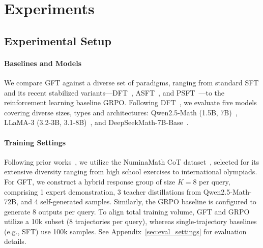 

\section{Experiments}
\subsection{Experimental Setup}
\label{sec:experimental_setup}

\paragraph{Baselines and Models}
We compare GFT against a diverse set of paradigms, ranging from standard SFT and its recent stabilized variants—DFT~\citep{wu2025generalization}, ASFT~\citep{zhu2025anchored}, and PSFT~\citep{zhu2025proximal}—to the reinforcement learning baseline GRPO. Following DFT~\citep{wu2025generalization}, we evaluate five models covering diverse sizes, types and architectures: Qwen2.5-Math (1.5B, 7B)~\citep{yang2024qwen2}, LLaMA-3 (3.2-3B, 3.1-8B)~\citep{dubey2024llama}, and DeepSeekMath-7B-Base~\citep{shao2024deepseekmath}.

\paragraph{Training Settings}
Following prior works~\citep{wu2025generalization,zhu2025anchored,ming2025one,zhou2025variational}, we utilize the NuminaMath CoT dataset~\citep{numina_math_datasets}, selected for its extensive diversity ranging from high school exercises to international olympiads. For GFT, we construct a hybrid response group of size $K=8$ per query, comprising 1 expert demonstration, 3 teacher distillations from Qwen2.5-Math-72B, and 4 self-generated samples. Similarly, the GRPO baseline is configured to generate 8 outputs per query. To align total training volume, GFT and GRPO utilize a 10k subset (8 trajectories per query), whereas single-trajectory baselines (e.g., SFT) use 100k samples. See Appendix~\ref{sec:eval_settings} for evaluation details.

